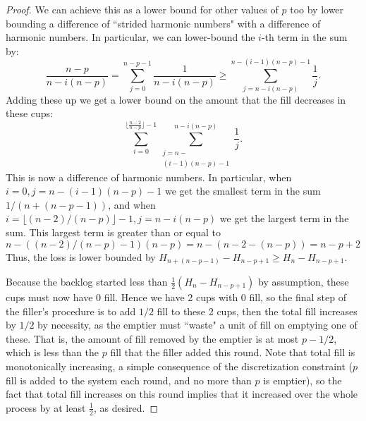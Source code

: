 \documentclass[twocolumn]{article}[11pt]
\begin{document}
\begin{proof}
We can achieve this as a lower bound for other values of $p$ too by lower
bounding a difference of ``strided harmonic numbers" with a difference of
harmonic numbers.
In particular, we can lower-bound the $i$-th term in the sum by:
$$\frac{n-p}{n-i(n-p)} = \sum_{j=0}^{n-p-1} \frac{1}{n-i(n-p)} \ge \sum_{j=n-i(n-p)}^{n-(i-1)(n-p)-1}\frac{1}{j}.$$
Adding these up we get a lower bound on the amount that the fill decreases in these cups:
$${\sum_{i=0}^{\big\lfloor\frac{n-2}{n-p}\big\rfloor - 1}}\sum_{\substack{j=n-\\(i-1)(n-p)-1}}^{n-i(n-p)}\frac{1}{j}.$$
This is now a difference of harmonic numbers. In particular, when $i=0,
j=n-(i-1)(n-p)-1$ we get the smallest term in the sum $1/(n+(n-p-1))$,
and when $i = \lfloor(n-2) / (n-p)\rfloor - 1, j=n-i(n-p)$ we get the largest
term in the sum. This largest term is greater than or equal to $n - ((n-2) /
(n-p)-1) (n-p) = n - (n-2 -(n-p)) = n-p+2$
Thus, the loss is lower bounded by $H_{n+(n-p-1)} - H_{n-p+1} \ge H_{n} - H_{n-p+1}$.

Because the backlog started less than $\frac{1}{2} (H_n - H_{n-p+1})$ by assumption, these cups must
now have $0$ fill.  Hence we have 2 cups with $0$ fill, so the final step of
the filler's procedure is to add $1/2$ fill to these 2 cups, then the total
fill increases by $1/2$ by necessity, as the emptier must ``waste" a unit of
fill on emptying one of these. That is, the amount of fill removed by the
emptier is at most $p-1/2$, which is less than the $p$ fill that the filler added this round. 
Note that total fill is monotonically increasing, a simple
consequence of the discretization constraint ($p$ fill is added to the system
each round, and no more than $p$ is emptier), so the fact that total fill
increases on this round implies that it increased over the whole process by at least $\frac{1}{2}$, as desired.
\end{proof}
\end{document}
